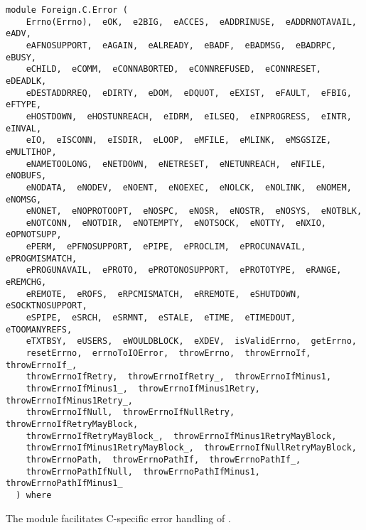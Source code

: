 \label{module:Foreign.C.Error}
\haddockbeginheader
{\haddockverb\begin{verbatim}
module Foreign.C.Error (
    Errno(Errno),  eOK,  e2BIG,  eACCES,  eADDRINUSE,  eADDRNOTAVAIL,  eADV, 
    eAFNOSUPPORT,  eAGAIN,  eALREADY,  eBADF,  eBADMSG,  eBADRPC,  eBUSY, 
    eCHILD,  eCOMM,  eCONNABORTED,  eCONNREFUSED,  eCONNRESET,  eDEADLK, 
    eDESTADDRREQ,  eDIRTY,  eDOM,  eDQUOT,  eEXIST,  eFAULT,  eFBIG,  eFTYPE, 
    eHOSTDOWN,  eHOSTUNREACH,  eIDRM,  eILSEQ,  eINPROGRESS,  eINTR,  eINVAL, 
    eIO,  eISCONN,  eISDIR,  eLOOP,  eMFILE,  eMLINK,  eMSGSIZE,  eMULTIHOP, 
    eNAMETOOLONG,  eNETDOWN,  eNETRESET,  eNETUNREACH,  eNFILE,  eNOBUFS, 
    eNODATA,  eNODEV,  eNOENT,  eNOEXEC,  eNOLCK,  eNOLINK,  eNOMEM,  eNOMSG, 
    eNONET,  eNOPROTOOPT,  eNOSPC,  eNOSR,  eNOSTR,  eNOSYS,  eNOTBLK, 
    eNOTCONN,  eNOTDIR,  eNOTEMPTY,  eNOTSOCK,  eNOTTY,  eNXIO,  eOPNOTSUPP, 
    ePERM,  ePFNOSUPPORT,  ePIPE,  ePROCLIM,  ePROCUNAVAIL,  ePROGMISMATCH, 
    ePROGUNAVAIL,  ePROTO,  ePROTONOSUPPORT,  ePROTOTYPE,  eRANGE,  eREMCHG, 
    eREMOTE,  eROFS,  eRPCMISMATCH,  eRREMOTE,  eSHUTDOWN,  eSOCKTNOSUPPORT, 
    eSPIPE,  eSRCH,  eSRMNT,  eSTALE,  eTIME,  eTIMEDOUT,  eTOOMANYREFS, 
    eTXTBSY,  eUSERS,  eWOULDBLOCK,  eXDEV,  isValidErrno,  getErrno, 
    resetErrno,  errnoToIOError,  throwErrno,  throwErrnoIf,  throwErrnoIf_, 
    throwErrnoIfRetry,  throwErrnoIfRetry_,  throwErrnoIfMinus1, 
    throwErrnoIfMinus1_,  throwErrnoIfMinus1Retry,  throwErrnoIfMinus1Retry_, 
    throwErrnoIfNull,  throwErrnoIfNullRetry,  throwErrnoIfRetryMayBlock, 
    throwErrnoIfRetryMayBlock_,  throwErrnoIfMinus1RetryMayBlock, 
    throwErrnoIfMinus1RetryMayBlock_,  throwErrnoIfNullRetryMayBlock, 
    throwErrnoPath,  throwErrnoPathIf,  throwErrnoPathIf_, 
    throwErrnoPathIfNull,  throwErrnoPathIfMinus1,  throwErrnoPathIfMinus1_
  ) where\end{verbatim}}
\haddockendheader

The module  facilitates C-specific error
 handling of .
\par

